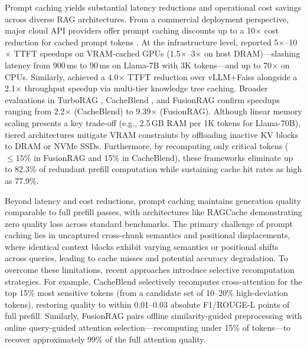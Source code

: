 Prompt caching yields substantial latency reductions and operational cost savings across diverse RAG architectures. From a commercial deployment perspective, major cloud API providers offer prompt caching discounts up to a 10$\times$ cost reduction for cached prompt tokens \citep{GoogleVertexAIPricing}. At the infrastructure level, \citet{gim2024promptcache} reported 5$\times$--10$\times$ TTFT speedups on VRAM-cached GPUs (1.5$\times$--3$\times$ on host DRAM)---slashing latency from 900\,ms to 90\,ms on Llama-7B with 3K tokens---and up to 70$\times$ on CPUs. Similarly, \citet{jin2025ragcache} achieved a 4.0$\times$ TTFT reduction over vLLM+Faiss alongside a 2.1$\times$ throughput speedup via multi-tier knowledge tree caching. Broader evaluations in TurboRAG \citep{lu2025turborag}, CacheBlend \citep{yao2025cacheblend}, and FusionRAG \citep{wang2026fusionrag} confirm speedups ranging from 2.2$\times$ (CacheBlend) to 9.39$\times$ (FusionRAG). Although linear memory scaling presents a key trade-off (e.g., 2.5\,GB RAM per 1K tokens for Llama-70B), tiered architectures mitigate VRAM constraints by offloading inactive KV blocks to DRAM or NVMe SSDs. Furthermore, by recomputing only critical tokens ($\le 15\%$ in FusionRAG and 15\% in CacheBlend), these frameworks eliminate up to 82.3\% of redundant prefill computation while sustaining cache hit rates as high as 77.9\%.

Beyond latency and cost reductions, prompt caching maintains generation quality comparable to full prefill passes, with architectures like RAGCache \citep{jin2025ragcache} demonstrating zero quality loss across standard benchmarks. The primary challenge of prompt caching lies in uncaptured cross-chunk semantics and positional displacements, where identical context blocks exhibit varying semantics or positional shifts across queries, leading to cache misses and potential accuracy degradation. To overcome these limitations, recent approaches introduce selective recomputation strategies. For example, CacheBlend \citep{yao2025cacheblend} selectively recomputes cross-attention for the top 15\% most sensitive tokens (from a candidate set of 10--20\% high-deviation tokens), restoring quality to within 0.01--0.03 absolute F1/ROUGE-L points of full prefill. Similarly, FusionRAG \citep{wang2026fusionrag} pairs offline similarity-guided preprocessing with online query-guided attention selection---recomputing under 15\% of tokens---to recover approximately 99\% of the full attention quality.
